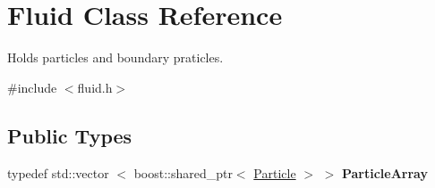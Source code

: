 \hypertarget{classFluid}{\section{\-Fluid \-Class \-Reference}
\label{classFluid}
}


\-Holds particles and boundary praticles.  




{\ttfamily \#include $<$fluid.\-h$>$}

\subsection*{\-Public \-Types}
\begin{DoxyCompactItemize}
\item 
\hypertarget{classFluid_a25e5d85ff44e6f570e3f85cd759d4375}{typedef std\-::vector\*
$<$ boost\-::shared\-\_\-ptr$<$ \hyperlink{classParticle}{\-Particle} $>$ $>$ {\bfseries \-Particle\-Array}}\label{classFluid_a25e5d85ff44e6f570e3f85cd759d4375}

\end{DoxyCompactItemize}
